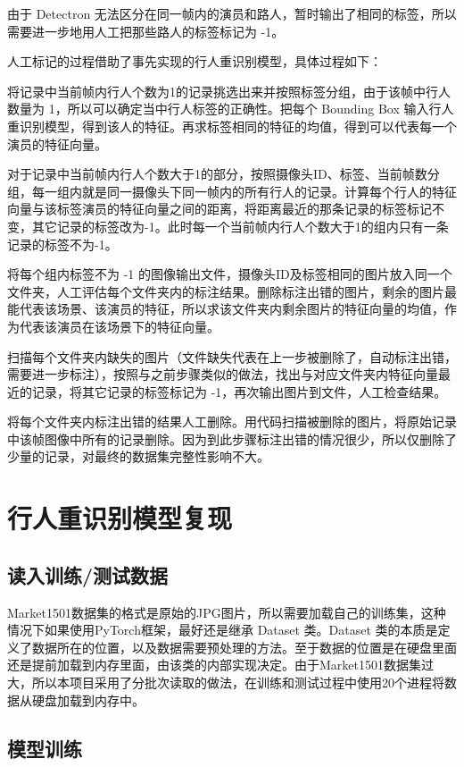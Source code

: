 由于 Detectron 无法区分在同一帧内的演员和路人，暂时输出了相同的标签，所以需要进一步地用人工把那些路人的标签标记为 -1。

人工标记的过程借助了事先实现的行人重识别模型，具体过程如下：

将记录中当前帧内行人个数为1的记录挑选出来并按照标签分组，由于该帧中行人数量为 1，所以可以确定当中行人标签的正确性。把每个 Bounding Box 输入行人重识别模型，得到该人的特征。再求标签相同的特征的均值，得到可以代表每一个演员的特征向量。

对于记录中当前帧内行人个数大于1的部分，按照摄像头ID、标签、当前帧数分组，每一组内就是同一摄像头下同一帧内的所有行人的记录。计算每个行人的特征向量与该标签演员的特征向量之间的距离，将距离最近的那条记录的标签标记不变，其它记录的标签改为-1。此时每一个当前帧内行人个数大于1的组内只有一条记录的标签不为-1。

将每个组内标签不为 -1 的图像输出文件，摄像头ID及标签相同的图片放入同一个文件夹，人工评估每个文件夹内的标注结果。删除标注出错的图片，剩余的图片最能代表该场景、该演员的特征，所以求该文件夹内剩余图片的特征向量的均值，作为代表该演员在该场景下的特征向量。

扫描每个文件夹内缺失的图片（文件缺失代表在上一步被删除了，自动标注出错，需要进一步标注），按照与之前步骤类似的做法，找出与对应文件夹内特征向量最近的记录，将其它记录的标签标记为 -1，再次输出图片到文件，人工检查结果。

将每个文件夹内标注出错的结果人工删除。用代码扫描被删除的图片，将原始记录中该帧图像中所有的记录删除。因为到此步骤标注出错的情况很少，所以仅删除了少量的记录，对最终的数据集完整性影响不大。

\section{行人重识别模型复现}

\subsection{读入训练/测试数据}

Market1501数据集的格式是原始的JPG图片，所以需要加载自己的训练集，这种情况下如果使用PyTorch框架，最好还是继承 Dataset 类。Dataset 类的本质是定义了数据所在的位置，以及数据需要预处理的方法。至于数据的位置是在硬盘里面还是提前加载到内存里面，由该类的内部实现决定。由于Market1501数据集过大，所以本项目采用了分批次读取的做法，在训练和测试过程中使用20个进程将数据从硬盘加载到内存中。

\subsection{模型训练}\label{sec:modeltraining}

